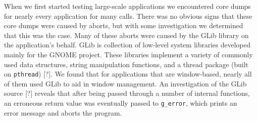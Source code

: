 When we first started testing large-scale applications we encountered core dumps for nearly every application for many calls. There was no obvious signs that these core dumps were caused by aborts, but with some investigation we determined that this was the case. Many of these aborts were caused by the GLib library on the application's behalf. GLib is collection of low-level system libraries developed mainly for the GNOME project. These libraries implement a variety of commonly used data structures, string manipulation functions, and a thread package (built on \texttt{pthread}) [?]. We found that for applications that are window-based, nearly all of them used GLib to aid in window management. An investigation of the GLib source [?] reveals that after being passed through a number of internal functions, an erroneous return value was eventually passed to \texttt{g\_error}, which prints an error message and aborts the program. 

